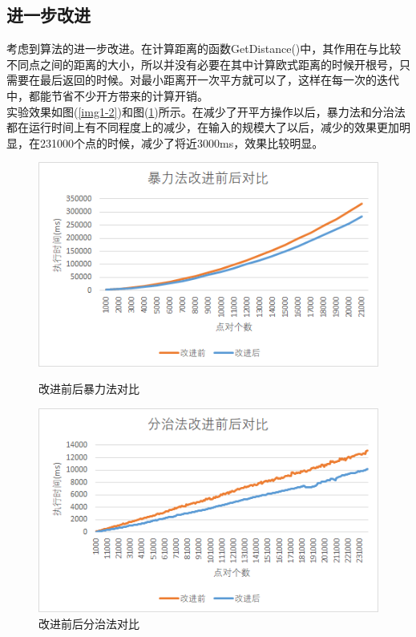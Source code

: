 \documentclass[UTF8]{ctexart}
\begin{document}
\subsection{进一步改进}

考虑到算法的进一步改进。在计算距离的函数GetDistance()中，其作用在与比较不同点之间的距离的大小，所以并没有必要在其中计算欧式距离的时候开根号，只需要在最后返回的时候。对最小距离开一次平方就可以了，这样在每一次的迭代中，都能节省不少开方带来的计算开销。\\
实验效果如图(\ref{img1-2})和图(\ref{img1-3})所示。在减少了开平方操作以后，暴力法和分治法都在运行时间上有不同程度上的减少，在输入的规模大了以后，减少的效果更加明显，在231000个点的时候，减少了将近3000ms，效果比较明显。

\begin{figure}[htbp]

    \begin{minipage}[t]{0.5\textwidth} %
        
    \centering
    \includegraphics[width=\textwidth]{img/1-2.png}
    \caption{改进前后暴力法对比}%
    \label{img1-2}
    \end{minipage}
    \begin{minipage}[t]{0.5\textwidth}
    \centering
    \includegraphics[width=\textwidth]{img/1-3.png}
    \caption{改进前后分治法对比}
    \label{img1-3}
    \end{minipage}
       
\end{figure}
\end{document}
